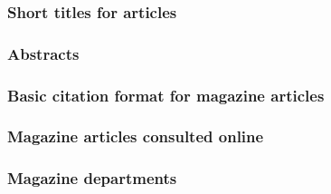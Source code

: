 \documentclass[11pt,letterpaper,oneside]{article}
\begin{document}
\begin{citebib}
\item \cite[414]{sewall1896}
\item \cite{moraes1950}
\end{citebib}

\subsubsection{Short titles for articles}

\begin{citebib}
\item \cite[223]{rosenblum2015}
\end{citebib}

\subsubsection{Abstracts}

\begin{citebib}
\item \cite{matute2015}
\end{citebib}

\setcounter{subsubsection}{187}
\subsubsection{Basic citation format for magazine articles}

\begin{citebib}
\item \cite[48]{saulnier2008}
\item \cite[59]{lepore2015}
\end{citebib}

\subsubsection{Magazine articles consulted online}

\begin{citebib}
\item \cite{vick2015}
\item \cite[5]{hanemann1926}
\end{citebib}

\subsubsection{Magazine departments}
\end{document}
